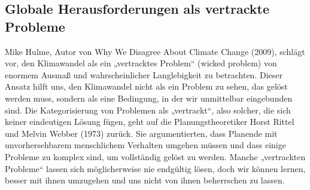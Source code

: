 \documentclass[
  letterpaper,
  DIV=11,
  numbers=noendperiod]{scrartcl}
\begin{document}
\subsection{Globale Herausforderungen als vertrackte
Probleme}\label{globale-herausforderungen-als-vertrackte-probleme}

Mike Hulme, Autor von Why We Disagree About Climate Change (2009),
schlägt vor, den Klimawandel als ein „vertracktes Problem`` (wicked
problem) von enormem Ausmaß und wahrscheinlicher Langlebigkeit zu
betrachten. Dieser Ansatz hilft uns, den Klimawandel nicht als ein
Problem zu sehen, das gelöst werden muss, sondern als eine Bedingung, in
der wir unmittelbar eingebunden sind. Die Kategorisierung von Problemen
als „vertrackt``, also solcher, die sich keiner eindeutigen Lösung
fügen, geht auf die Planungstheoretiker Horst Rittel und Melvin Webber
(1973) zurück. Sie argumentierten, dass Planende mit unvorhersehbarem
menschlichem Verhalten umgehen müssen und dass einige Probleme zu
komplex sind, um vollständig gelöst zu werden. Manche „vertrackten
Probleme`` lassen sich möglicherweise nie endgültig lösen, doch wir
können lernen, besser mit ihnen umzugehen und uns nicht von ihnen
beherrschen zu lassen.
\end{document}
